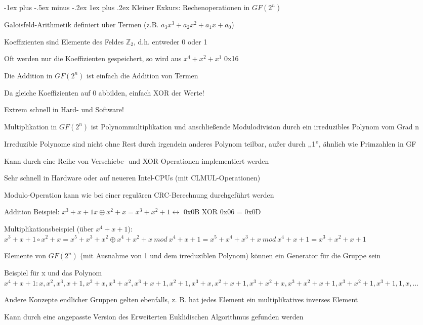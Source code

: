 \documentclass[a4paper]{article}
\makeatletter
\renewcommand{\subsubsection}{\@startsection{subsubsection}{3}{0mm}%
 {-1ex plus -.5ex minus -.2ex}%
 {1ex plus .2ex}%
 {\normalfont\small\bfseries}}
\makeatother
\begin{document}
\begin{multicols}{3}
      \subsubsection{Kleiner Exkurs: Rechenoperationen in $GF(2^n)$}
      \begin{itemize*}
            \item Galoisfeld-Arithmetik definiert über Termen (z.B. $a_3x^3+a_2x^2+a_1x+a_0$)
            \item Koeffizienten sind Elemente des Feldes $\mathbb{Z}_2$, d.h. entweder 0 oder 1
            \item Oft werden nur die Koeffizienten gespeichert, so wird aus $x^4+x^2 +x^1$ 0x16
            \item Die Addition in $GF(2^n)$ ist einfach die Addition von Termen
            \begin{itemize*}
                  \item Da gleiche Koeffizienten auf 0 abbilden, einfach XOR der Werte!
                  \item Extrem schnell in Hard- und Software!
            \end{itemize*}
            \item Multiplikation in $GF(2^n)$ ist Polynommultiplikation und
            anschließende Modulodivision durch ein irreduzibles Polynom vom Grad n
            \begin{itemize*}
                  \item Irreduzible Polynome sind nicht ohne Rest durch irgendein anderes Polynom teilbar, außer durch ,,1'', ähnlich wie Primzahlen in GF
                  \item Kann durch eine Reihe von Verschiebe- und XOR-Operationen implementiert werden
                  \item Sehr schnell in Hardware oder auf neueren Intel-CPUs (mit CLMUL-Operationen)
                  \item Modulo-Operation kann wie bei einer regulären CRC-Berechnung durchgeführt werden
            \end{itemize*}
            \item Addition Beispiel: $x^3 +x+1 x\oplus x^2+x = x^3 +x^2 +1 \leftrightarrow$ 0x0B XOR 0x06 = 0x0D
            \item Multiplikationsbeispiel (über $x^4 +x+1$): $x^3 +x+1\circ x^2+x = x^5+x^3+x^2\oplus x^4+x^2+x\ mod\ x^4+x+1=x^5+x^4+x^3+x\ mod\ x^4+x+1 = x^3 +x^2 +x+1$
            \item Elemente von $GF(2^n)$ (mit Ausnahme von 1 und dem irreduziblen
            Polynom) können ein Generator für die Gruppe sein
            \item Beispiel für x und das Polynom $x^4+x+1:x,x^2,x^3,x+1,x^2+x,x^3+x^2,x^3+x+1,x^2 +1,x^3+x,x^2+x+1,x^3+x^2+x,x^3+x^2+x+1,x^3+x^2+1,x^3+1,1,x,...$
            \item Andere Konzepte endlicher Gruppen gelten ebenfalls, z. B. hat jedes Element ein multiplikatives inverses Element
            \item Kann durch eine angepasste Version des Erweiterten Euklidischen Algorithmus gefunden werden
      \end{itemize*}


\end{multicols}
\end{document}
